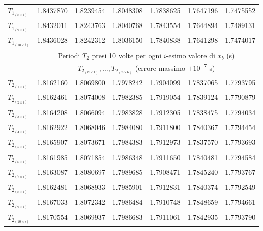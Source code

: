 \begin{table*}[!p]
\begin{ruledtabular}
\begin{tabular}{llllllc}
            $T_{1_{(8 \times i)}}$ & 1.8437870 & 1.8239454          & 1.8048308          & 1.7838625 & 1.7647196 & 1.7475552                  \\
            $T_{1_{(9 \times i)}}$ & 1.8432011 & 1.8243763          & 1.8040768          & 1.7843554 & 1.7644894 & 1.7489131                  \\
            $T_{1_{(10\times i)}}$ & 1.8436028 & 1.8242312          & 1.8036150          & 1.7840838 & 1.7641298 & 1.7474017                  \\
            \colrule
                                   & \multicolumn{6}{c}{Periodi $T_2$ presi 10 volte per ogni $i$-esimo valore di $x_b$ (s)}                  \\
                                   & \multicolumn{6}{c}{$T_{2_{(n \times 1)}}, \ldots, T_{2_{(n \times 6)}}$ (errore massimo $\pm10^{-7}$ s)} \\
            \colrule
            $T_{2_{(1 \times i)}}$ & 1.8162160 & 1.8069800          & 1.7978242          & 1.7904099 & 1.7837065 & 1.7793795                  \\
            $T_{2_{(2 \times i)}}$ & 1.8162461 & 1.8074008          & 1.7982385          & 1.7919054 & 1.7839124 & 1.7790879                  \\
            $T_{2_{(3 \times i)}}$ & 1.8164208 & 1.8066094          & 1.7983828          & 1.7912305 & 1.7838475 & 1.7794034                  \\
            $T_{2_{(4 \times i)}}$ & 1.8162922 & 1.8068046          & 1.7984080          & 1.7911800 & 1.7840367 & 1.7794454                  \\
            $T_{2_{(5 \times i)}}$ & 1.8165907 & 1.8073671          & 1.7984383          & 1.7912973 & 1.7837570 & 1.7793693                  \\
            $T_{2_{(6 \times i)}}$ & 1.8161985 & 1.8071854          & 1.7986348          & 1.7911650 & 1.7840481 & 1.7794584                  \\
            $T_{2_{(7 \times i)}}$ & 1.8163087 & 1.8080697          & 1.7989685          & 1.7908471 & 1.7845240 & 1.7793767                  \\
            $T_{2_{(8 \times i)}}$ & 1.8162481 & 1.8068933          & 1.7985901          & 1.7912831 & 1.7840374 & 1.7792549                  \\
            $T_{2_{(9 \times i)}}$ & 1.8167033 & 1.8072342          & 1.7986484          & 1.7910748 & 1.7848659 & 1.7794661                  \\
            $T_{2_{(10\times i)}}$ & 1.8170554 & 1.8069937          & 1.7986683          & 1.7911061 & 1.7842935 & 1.7793790                  
        \end{tabular}
    \end{ruledtabular}
\end{table*}